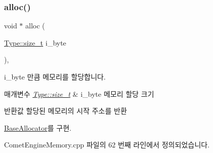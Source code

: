 \subsubsection{\texorpdfstring{alloc()}{alloc()}}
{\footnotesize\ttfamily void $\ast$ alloc (\begin{DoxyParamCaption}\item[{\hyperlink{namespace_comet_engine_1_1_type_a7c94ea6f8948649f8d181ae55911eeaf}{Type\+::size\+\_\+t}}]{i\+\_\+byte }\end{DoxyParamCaption})\hspace{0.3cm}{\ttfamily [override]}, {\ttfamily [virtual]}}



i\+\_\+byte 만큼 메모리를 할당합니다. 


\begin{DoxyParams}{매개변수}
{\em \hyperlink{namespace_comet_engine_1_1_type_a7c94ea6f8948649f8d181ae55911eeaf}{Type\+::size\+\_\+t}} & i\+\_\+byte 메모리 할당 크기 \\
\hline
\end{DoxyParams}
\begin{DoxyReturn}{반환값}
할당된 메모리의 시작 주소를 반환 
\end{DoxyReturn}


\hyperlink{class_comet_engine_1_1_core_1_1_memory_1_1_base_allocator_a8f51b4daa12e31477f57003494c09098}{Base\+Allocator}를 구현.



Comet\+Engine\+Memory.\+cpp 파일의 62 번째 라인에서 정의되었습니다.


